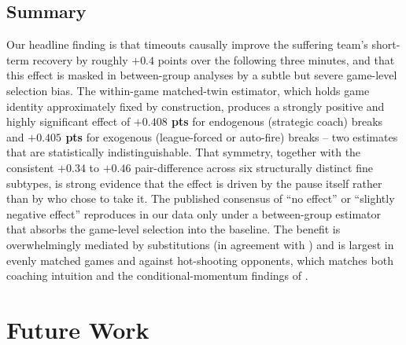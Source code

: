 \documentclass[twoside,11pt]{article}
\begin{document}
\subsection{Summary}

Our headline finding is that timeouts causally improve the suffering team's short-term recovery by roughly
$+0.4$ points over the following three minutes, and that this effect is masked in between-group analyses by
a subtle but severe game-level selection bias. The within-game matched-twin estimator, which holds game
identity approximately fixed by construction, produces a strongly positive and highly significant effect of
\textbf{$+0.408$ pts} for endogenous (strategic coach) breaks and \textbf{$+0.405$ pts} for exogenous
(league-forced or auto-fire) breaks -- two estimates that are statistically indistinguishable. That
symmetry, together with the consistent $+0.34$ to $+0.46$ pair-difference across six structurally distinct
fine subtypes, is strong evidence that the effect is driven by the pause itself rather than by who chose to
take it. The published consensus of ``no effect'' or ``slightly negative effect''
\citep{assis2020stop,gibbs2021causal} reproduces in our data only under a between-group estimator that
absorbs the game-level selection into the baseline. The benefit is overwhelmingly mediated by substitutions
(in agreement with \citet{weimer2023causal}) and is largest in evenly matched games and against hot-shooting
opponents, which matches both coaching intuition and the conditional-momentum findings of
\citet{qiu2025interrupt}.

\section{Future Work}\label{sec:future}
\end{document}
